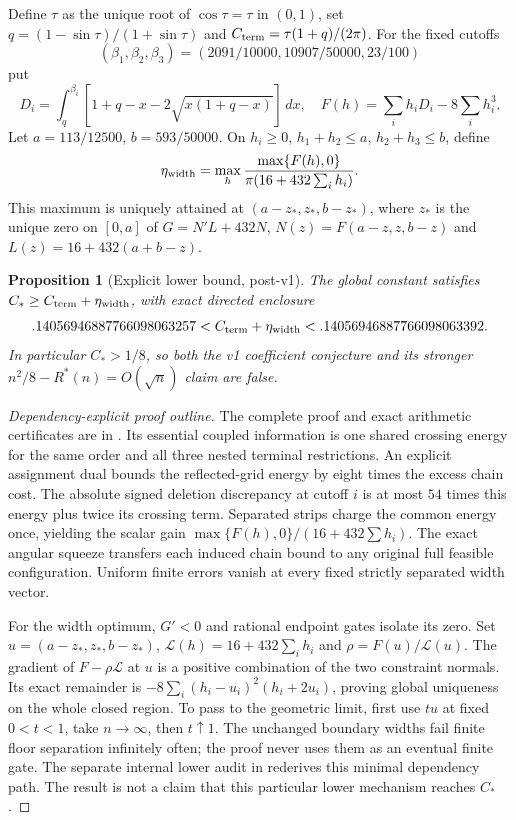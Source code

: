 \documentclass[11pt]{article}
\newtheorem{proposition}[theorem]{Proposition}
\theoremstyle{definition}\newtheorem{definition}[theorem]{Definition}
\theoremstyle{remark}\newtheorem{remark}[theorem]{Remark}
\newcommand{\Rstar}{R^\ast}
\newcommand{\CC}{C_\ast}
\begin{document}
Define $\tau$ as the unique root of $\cos\tau=\tau$ in $(0,1)$, set
$q=(1-\sin\tau)/(1+\sin\tau)$ and
$C_{\rm term}=\tau(1+q)/(2\pi)$.
For the fixed cutoffs
\[
 (\beta_1,\beta_2,\beta_3)=(2091/10000,10907/50000,23/100)
\]
put
\[
 D_i=\int_q^{\beta_i}[1+q-x-2\sqrt{x(1+q-x)}]\,dx,
 \quad F(h)=\sum_i h_iD_i-8\sum_i h_i^3.
\]
Let $a=113/12500$, $b=593/50000$. On
$h_i\ge0$, $h_1+h_2\le a$, $h_2+h_3\le b$, define
\[
 \eta_{\rm width}=\max_h
 \frac{\max\{F(h),0\}}{\pi(16+432\sum_i h_i)}.
\]
This maximum is uniquely attained at $(a-z_*,z_*,b-z_*)$, where $z_*$
is the unique zero on $[0,a]$ of $G=N'L+432N$,
$N(z)=F(a-z,z,b-z)$ and $L(z)=16+432(a+b-z)$.

\begin{proposition}[Explicit lower bound, post-v1]\label{prop:lower}
The global constant satisfies $\CC\ge C_{\rm term}+\eta_{\rm width}$,
with exact directed enclosure
\[
 .14056946887766098063257
 < C_{\rm term}+\eta_{\rm width}
 < .14056946887766098063392.
\]
In particular $\CC>1/8$, so both the v1 coefficient conjecture and its
stronger $n^2/8-\Rstar(n)=O(\sqrt n)$ claim are false.
\end{proposition}
\begin{proof}[Dependency-explicit proof outline]
The complete proof and exact arithmetic certificates are in \cite{lower}.
Its essential coupled information is one shared crossing energy for the
same order and all three nested terminal restrictions. An explicit assignment
dual bounds the reflected-grid energy by eight times the excess chain cost.
The absolute signed deletion discrepancy at cutoff $i$ is at most $54$
times this energy plus twice its crossing term. Separated strips charge
the common energy once, yielding
the scalar gain $\max\{F(h),0\}/(16+432\sum h_i)$.
The exact angular squeeze transfers each induced chain bound to any original
full feasible configuration. Uniform finite errors vanish at every fixed
strictly separated width vector.

For the width optimum, $G'<0$ and rational endpoint gates isolate its zero.
Set $u=(a-z_*,z_*,b-z_*)$, $\mathcal L(h)=16+432\sum_i h_i$ and
$\rho=F(u)/\mathcal L(u)$. The gradient of $F-\rho\mathcal L$ at $u$ is a positive
combination of the two constraint normals. Its exact remainder is
$-8\sum_i(h_i-u_i)^2(h_i+2u_i)$, proving global uniqueness on the whole
closed region. To pass to the geometric limit, first use $tu$ at fixed
$0<t<1$, take $n\to\infty$, then $t\uparrow1$. The unchanged boundary
widths fail finite floor separation infinitely often; the proof never uses
them as an eventual finite gate. The separate internal lower audit in
\cite{lower} rederives this minimal dependency path. The result is not a
claim that this particular lower mechanism reaches $\CC$.
\end{proof}
\end{document}
